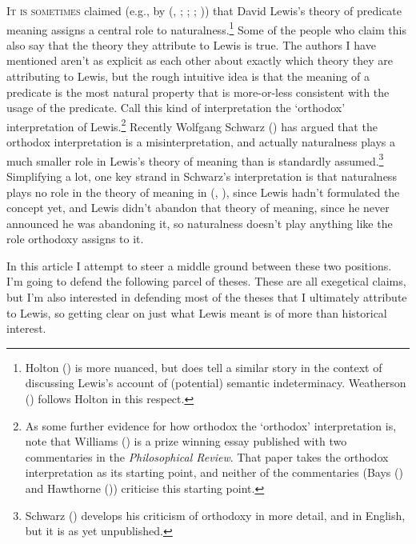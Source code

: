\documentclass[
  11pt,
  letterpaper,
  DIV=11,
  numbers=noendperiod,
  twoside]{scrartcl}
\begin{document}
\lettrine{I}{t is sometimes} claimed (e.g., by
(,
;
;
;
)) that David
Lewis's theory of predicate meaning assigns a central role to
naturalness.\footnote{Holton () is
  more nuanced, but does tell a similar story in the context of
  discussing Lewis's account of (potential) semantic indeterminacy.
  Weatherson () follows Holton in
  this respect.} Some of the people who claim this also say that the
theory they attribute to Lewis is true. The authors I have mentioned
aren't as explicit as each other about exactly which theory they are
attributing to Lewis, but the rough intuitive idea is that the meaning
of a predicate is the most natural property that is more-or-less
consistent with the usage of the predicate. Call this kind of
interpretation the `orthodox' interpretation of Lewis.\footnote{As some
  further evidence for how orthodox the `orthodox' interpretation is,
  note that Williams () is a prize
  winning essay published with two commentaries in the
  \emph{Philosophical Review}. That paper takes the orthodox
  interpretation as its starting point, and neither of the commentaries
  (Bays () and Hawthorne
  ()) criticise this starting point.}
Recently Wolfgang Schwarz () has
argued that the orthodox interpretation is a misinterpretation, and
actually naturalness plays a much smaller role in Lewis's theory of
meaning than is standardly assumed.\footnote{Schwarz
  () develops his criticism of orthodoxy
  in more detail, and in English, but it is as yet unpublished.}
Simplifying a lot, one key strand in Schwarz's interpretation is that
naturalness plays no role in the theory of meaning in
(,
), since Lewis hadn't formulated the
concept yet, and Lewis didn't abandon that theory of meaning, since he
never announced he was abandoning it, so naturalness doesn't play
anything like the role orthodoxy assigns to it.

In this article I attempt to steer a middle ground between these two
positions. I'm going to defend the following parcel of theses. These are
all exegetical claims, but I'm also interested in defending most of the
theses that I ultimately attribute to Lewis, so getting clear on just
what Lewis meant is of more than historical interest.
\end{document}
